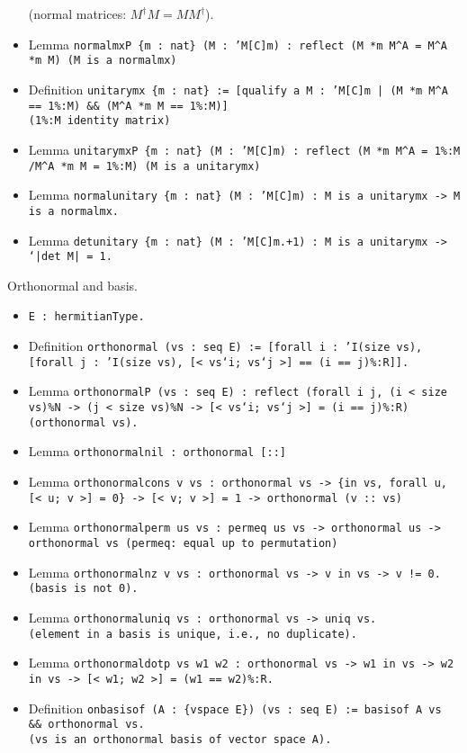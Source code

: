 \begin{itemize}
  	(normal matrices: $M^\dag M = MM^\dag$).
\item Lemma \tt{normalmxP \{m : nat\} (M : 'M[C]\us m) :
  reflect (M *m M\^{}A = M\^{}A *m M) (M \bs is a normalmx)}
\item Definition \tt{unitarymx \{m : nat\} :=
  [qualify a M : 'M[C]\us m | (M *m M\^{}A == 1\%:M) \&\& (M\^{}A *m M == 1\%:M)]} \\
  (\tt{1\%:M} identity matrix)
\item Lemma \tt{unitarymxP \{m : nat\} (M : 'M[C]\us m) :
  reflect (M *m M\^{}A = 1\%:M /\bs M\^{}A *m M = 1\%:M) (M \bs is a unitarymx)}
\item Lemma \tt{normal\us unitary \{m : nat\} (M : 'M[C]\us m) :
  M \bs is a unitarymx -> M \bs is a normalmx.}
\item Lemma \tt{det\us unitary \{m : nat\} (M : 'M[C]\us m.+1) :
  M \bs is a unitarymx -> `|\bs det M| = 1.}
\end{itemize}

\noindent Orthonormal and basis.
\begin{itemize}
\item \tt{E : hermitianType}.
\item Definition \tt{orthonormal (vs : seq E) :=
  [forall i : 'I\us (size vs),
    [forall j : 'I\us (size vs),
      [< vs`\us i; vs`\us j >] == (i == j)\%:R]].}
\item Lemma \tt{orthonormalP (vs : seq E) :
  reflect
    (forall i j, (i < size vs)\%N -> (j < size vs)\%N ->
       [< vs`\us i; vs`\us j >] = (i == j)\%:R)
    (orthonormal vs).}
\item Lemma \tt{orthonormal\us nil : orthonormal [::]}
\item Lemma \tt{orthonormal\us cons v vs :
     orthonormal vs
  -> \{in vs, forall u, [< u; v >] = 0\}
  -> [< v; v >] = 1
  -> orthonormal (v :: vs)}
\item Lemma \tt{orthonormal\us perm us vs :
     perm\us eq us vs
  -> orthonormal us
  -> orthonormal vs} (\tt{perm\us eq}: equal up to permutation)
\item Lemma \tt{orthonormal\us nz v vs : orthonormal vs -> v \bs in vs -> v != 0.} \\
	(basis is not 0).
\item Lemma \tt{orthonormal\us uniq vs : orthonormal vs -> uniq vs.} \\
	(element in a basis is unique, i.e., no duplicate).
\item Lemma \tt{orthonormal\us dotp vs w1 w2 :
  orthonormal vs -> w1 \bs in vs -> w2 \bs in vs -> [< w1; w2 >] = (w1 == w2)\%:R.} 
\item Definition \tt{onbasis\us of (A : \{vspace E\}) (vs : seq E) :=
  basis\us of A vs \&\& orthonormal vs.} \\
  (\tt{vs} is an orthonormal basis of vector space \tt{A}).
\end{itemize}

